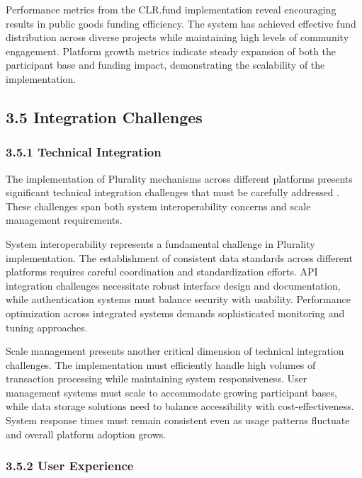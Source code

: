 Performance metrics from the CLR.fund implementation reveal encouraging results in public goods funding efficiency. The system has achieved effective fund distribution across diverse projects while maintaining high levels of community engagement. Platform growth metrics indicate steady expansion of both the participant base and funding impact, demonstrating the scalability of the implementation.

\hypertarget{integration-challenges}{%
\subsection{3.5 Integration Challenges}\label{integration-challenges}}

\hypertarget{technical-integration}{%
\subsubsection{3.5.1 Technical Integration}\label{technical-integration}}

The implementation of Plurality mechanisms across different platforms presents significant technical integration challenges that must be carefully addressed \citep{polis2024}. These challenges span both system interoperability concerns and scale management requirements.

System interoperability represents a fundamental challenge in Plurality implementation. The establishment of consistent data standards across different platforms requires careful coordination and standardization efforts. API integration challenges necessitate robust interface design and documentation, while authentication systems must balance security with usability. Performance optimization across integrated systems demands sophisticated monitoring and tuning approaches.

Scale management presents another critical dimension of technical integration challenges. The implementation must efficiently handle high volumes of transaction processing while maintaining system responsiveness. User management systems must scale to accommodate growing participant bases, while data storage solutions need to balance accessibility with cost-effectiveness. System response times must remain consistent even as usage patterns fluctuate and overall platform adoption grows.

\hypertarget{user-experience}{%
\subsubsection{3.5.2 User Experience}\label{user-experience}}

